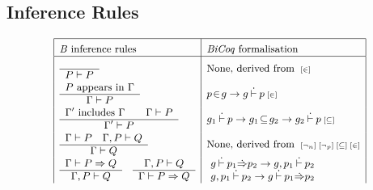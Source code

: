 \documentclass{llncs}
\begin{document}
\subsection{Inference Rules}\label{ss_infer}

\begin{table}
\caption{Encoding of the \emph{B} inference rules}
\label{BINF}
\[
\small
\begin{array}{|l|l|}
\hline
\rule{0cm}{12pt}\text{\emph{B} inference rules}
&
\text{\emph{BiCoq} formalisation}
\\
\hline

\begin{array}{c}
\\\hline P \vdash P
\end{array}
&
\text{None, derived from }\rulename{\in}

\\

\begin{array}{c}
P \text{ appears in } \Gamma \\\hline \Gamma \vdash P
\end{array}
&
p\!\in\!g \to g \Binf p\rulename{\in}

\\

\begin{array}{c}
\Gamma' \text{ includes } \Gamma \quad\quad \Gamma \vdash P
\\\hline \Gamma' \vdash P
\end{array}
&
g_1\Binf p \to g_1\!\subseteq\!g_2 \to g_2\Binf p\rulename{\subseteq}

\\

\begin{array}{c}
\Gamma \vdash P \quad \Gamma,P \vdash Q \\\hline \Gamma \vdash Q
\end{array}
&
\text{None, derived from }\rulename{\lnot_{n}}\rulename{\lnot_{p}}
                          \rulename{\subseteq}\rulename{\in}

\\

\begin{array}{c}
\Gamma \vdash P \Rightarrow Q \\\hline \Gamma,P\vdash Q
\end{array}
\quad
\begin{array}{c}
\Gamma,P\vdash Q \\\hline \Gamma \vdash P \Rightarrow Q
\end{array}
&
\begin{array}{l}
\!g\Binf p_1 \pimp p_2 \to g,p_1\Binf p_2 \\
\!g,p_1\Binf p_2 \to g\Binf p_1 \pimp p_2
\end{array}


\end{array}\]
\end{table}
\end{document}
